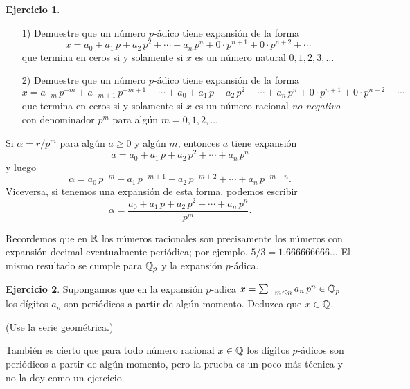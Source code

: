\documentclass{article}
\numberwithin{equation}{section}
\theoremstyle{definition}
\newtheorem{ejerc}{Ejercicio}
\begin{document}
\begin{ejerc}
  ~

  \begin{enumerate}
  \item[1)] Demuestre que un número $p$-ádico tiene expansión de la forma
    $$x = a_0 + a_1\,p + a_2\,p^2 + \cdots + a_n\,p^n + 0\cdot p^{n+1} + 0\cdot p^{n+2} + \cdots$$
    que termina en ceros si y solamente si $x$ es un número natural
    $0,1,2,3,\ldots$

  \item[2)] Demuestre que un número $p$-ádico tiene expansión de la forma
    \[ x = a_{-m}\,p^{-m} + a_{-m+1}\,p^{-m+1} + \cdots +
           a_0 + a_1\,p + a_2\,p^2 + \cdots +
           a_n\,p^n + 0\cdot p^{n+1} + 0\cdot p^{n+2} + \cdots \]
    que termina en ceros si y solamente si $x$ es un número racional
    \emph{no negativo} con denominador $p^m$ para algún $m = 0,1,2,\ldots$
  \end{enumerate}

  \ifdefined\solutions\begin{solucion}
    Si $\alpha = r/p^m$ para algún $a \ge 0$ y algún $m$, entonces $a$ tiene
    expansión
    $$a = a_0 + a_1\,p + a_2\,p^2 + \cdots + a_n\,p^n$$
    y luego
    \[ \alpha = a_0\,p^{-m} + a_1\,p^{-m+1} + a_2\,p^{-m+2} + \cdots +
                    a_n\,p^{-m+n}. \]
    Viceversa, si tenemos una expansión de esta forma, podemos escribir
    $$\alpha = \frac{a_0 + a_1\,p + a_2\,p^2 + \cdots + a_n\,p^n}{p^m}.$$
  \end{solucion}\fi
\end{ejerc}

Recordemos que en $\mathbb{R}$ los números racionales son precisamente los números
con expansión decimal eventualmente periódica; por ejemplo,
$5/3 = 1.666666666\ldots$ El mismo resultado se cumple para $\mathbb{Q}_p$
y la expansión $p$-ádica.

\begin{ejerc}
  Supongamos que en la expansión $p$-adica
  $x = \sum_{-m\le n} a_n\,p^n \in\mathbb{Q}_p$ los dígitos $a_n$ son periódicos
  a partir de algún momento. Deduzca que $x\in\mathbb{Q}$.

  \noindent (Use la serie geométrica.)
\end{ejerc}

También es cierto que para todo número racional $x\in\mathbb{Q}$ los dígitos $p$-ádicos
son periódicos a partir de algún momento, pero la prueba es un poco más técnica
y no la doy como un ejercicio.

\end{document}

